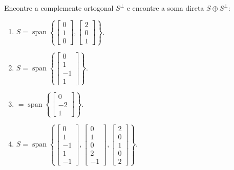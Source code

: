 \begin{question}
  Encontre a complemente ortogonal $S^{\perp}$ e encontre a soma direta $S \oplus S^{\perp}$:
  \begin{multicols}{2}
    \begin{enumerate}[label=\alph*)]
      \item $S = \operatorname{span}\left\{
              \begin{bmatrix} 0 \\ 1 \\ 0 \end{bmatrix},
              \begin{bmatrix} 2 \\ 0 \\ 1 \end{bmatrix}
              \right\}$.
      \item $S = \operatorname{span}\left\{
              \begin{bmatrix} 0 \\ 1 \\ -1 \\ 1 \end{bmatrix}
              \right\}$.
      \item $= \operatorname{span}\left\{
              \begin{bmatrix} 0 \\ -2 \\ 1 \end{bmatrix}
              \right\}$.
      \item $ S = \operatorname{span}\left\{
              \begin{bmatrix} 0 \\ 1 \\ -1 \\ 1 \\ -1 \end{bmatrix},
              \begin{bmatrix} 0 \\ 1 \\ 0 \\ 2 \\ -1 \end{bmatrix},
              \begin{bmatrix} 2 \\ 0 \\ 1 \\ 0 \\ 2 \end{bmatrix}
              \right\}$.
    \end{enumerate}
  \end{multicols}
  \vspace{8pt}
\end{question}

